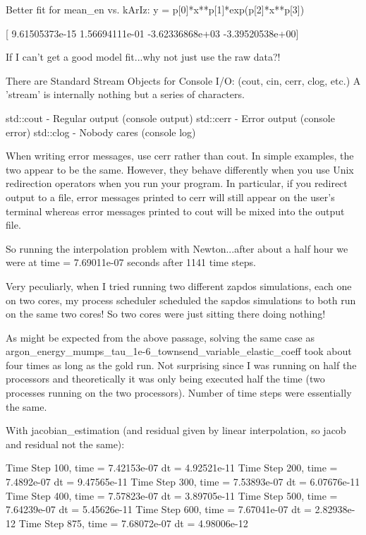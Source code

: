 {Better fit for mean_en vs. kArIz:     y = p[0]*x**p[1]*exp(p[2]*x**p[3])

[  9.61505373e-15   1.56694111e-01  -3.62336868e+03  -3.39520538e+00]

If I can't get a good model fit...why not just use the raw data?!

There are Standard Stream Objects for Console I/O: (cout, cin, cerr, clog, etc.) A 'stream' is internally nothing but a series of characters.

std::cout - Regular output (console output)
std::cerr - Error output (console error)
std::clog - Nobody cares (console log)

When writing error messages, use cerr rather than cout. In simple examples, the two appear to be the same. However, they behave differently when you use Unix redirection operators when you run your program. In particular, if you redirect output to a file, error messages printed to cerr will still appear on the user's terminal whereas error messages printed to cout will be mixed into the output file.

So running the interpolation problem with Newton...after about a half hour we were at time = 7.69011e-07 seconds after 1141 time steps.

Very peculiarly, when I tried running two different zapdos simulations, each one on two cores, my process scheduler scheduled the sapdos simulations to both run on the same two cores! So two cores were just sitting there doing nothing!

As might be expected from the above passage, solving the same case as argon_energy_mumps_tau_1e-6_townsend_variable_elastic_coeff took about four times as long as the gold run. Not surprising since I was running on half the processors and theoretically it was only being executed half the time (two processes running on the two processors). Number of time steps were essentially the same.

With jacobian_estimation (and residual given by linear interpolation, so jacob and residual not the same):

Time Step 100, time = 7.42153e-07
                dt = 4.92521e-11
Time Step 200, time = 7.4892e-07
                dt = 9.47565e-11
Time Step 300, time = 7.53893e-07
                dt = 6.07676e-11
Time Step 400, time = 7.57823e-07
                dt = 3.89705e-11
Time Step 500, time = 7.64239e-07
                dt = 5.45626e-11
Time Step 600, time = 7.67041e-07
                dt = 2.82938e-12
Time Step 875, time = 7.68072e-07
                dt = 4.98006e-12

}
